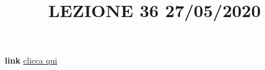 \newline
\newline
\title{LEZIONE 36 27/05/2020}\newline
\textbf{link} \href{https://web.microsoftstream.com/video/7ff928d7-ba2f-4574-b69c-6feb66c6b14f?list=user&userId=faa91214-a6f5-40d7-8875-253fd49b8ce1}{clicca qui}
